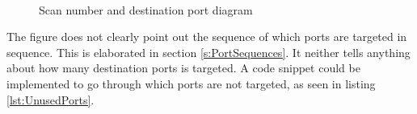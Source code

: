 \begin{figure}[!ht]
    \\
    \caption{Scan number and destination port diagram}%
    \label{fig:ScanNumberDstPort}%
\end{figure}

The figure does not clearly point out the sequence of which ports are targeted in sequence. This is elaborated in section \ref{s:PortSequences}. It neither tells anything about how many destination ports is targeted. A code snippet could be implemented to go through which ports are not targeted, as seen in listing \ref{lst:UnusedPorts}.

